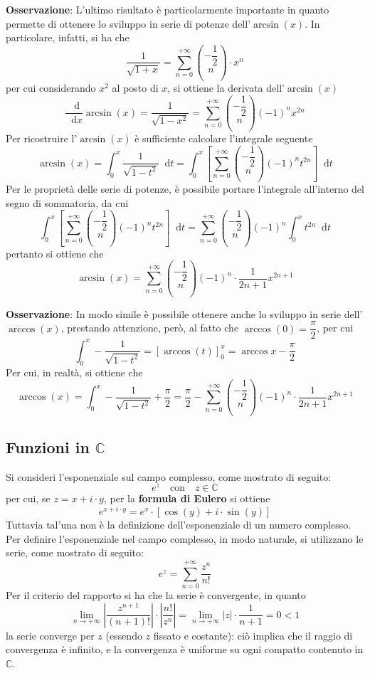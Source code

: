 \documentclass[a4paper]{extarticle}
\newcommand*\dif{\mathop{}\!\mathrm{d}}
\begin{document}
\vspace{1em}
\noindent
\textbf{Osservazione}: L'ultimo risultato è particolarmente importante in quanto permette di ottenere lo sviluppo in serie di potenze dell'$\arcsin(x)$. In particolare, infatti, si ha che
\[\frac{1}{\sqrt{1+x}} = \sum_{n=0}^{+\infty} \binom{-\dfrac{1}{2}}{n} \cdot x^n\]
per cui considerando $x^2$ al posto di $x$, si ottiene la derivata dell'$\arcsin(x)$
\[\dfrac{\dif}{\dif x} \arcsin(x) = \frac{1}{\sqrt{1-x^2}} = \sum_{n=0}^{+\infty} \binom{-\dfrac{1}{2}}{n} (-1)^n x^{2n}\]
Per ricostruire l'$\arcsin(x)$ è sufficiente calcolare l'integrale seguente
\[\arcsin(x)=\int_0^x \frac{1}{\sqrt{1-t^2}} \dif t = \int_0^x \left[ \sum_{n=0}^{+\infty} \binom{-\dfrac{1}{2}}{n} (-1)^n t^{2n}\right] \dif t\]
Per le proprietà delle serie di potenze, è possibile portare l'integrale all'interno del segno di sommatoria, da cui
\[\int_0^x \left[ \sum_{n=0}^{+\infty} \binom{-\dfrac{1}{2}}{n} (-1)^n t^{2n}\right] \dif t = \sum_{n=0}^{+\infty} \binom{-\dfrac{1}{2}}{n} (-1)^n \int_0^x t^{2n} \dif t\]
pertanto si ottiene che
\[\arcsin(x)=\sum_{n=0}^{+\infty} \binom{-\dfrac{1}{2}}{n} (-1)^n \cdot \frac{1}{2n+1} x^{2n+1}\]

\vspace{1em}
\noindent
\textbf{Osservazione}: In modo simile è possibile ottenere anche lo sviluppo in serie dell'$\arccos(x)$, prestando attenzione, però, al fatto che $\arccos(0)=\dfrac{\pi}{2}$, per cui
\[\int_0^x - \dfrac{1}{\sqrt{1-t^2}} = [\arccos(t)]_0^x = \arccos{x}-\dfrac{\pi}{2}\]
Per cui, in realtà, si ottiene che
\[\arccos(x) = \int_0^x - \dfrac{1}{\sqrt{1-t^2}} + \dfrac{\pi}{2} = \dfrac{\pi}{2}-\sum_{n=0}^{+\infty} \binom{-\dfrac{1}{2}}{n} (-1)^n \cdot \frac{1}{2n+1} x^{2n+1}\]

\vspace{1em}
\noindent
\subsection{Funzioni in $\mathbb{C}$}
Si consideri l'esponenziale sul campo complesso, come mostrato di seguito:
\[e^z \hspace{1em} \text{con} \hspace{1em} z \in \mathbb{C}\]
per cui, se $z=x+i \cdot y$, per la \textbf{formula di Eulero} si ottiene
\[e^{x+i\cdot y} = e^x \cdot \left[\cos(y) + i \cdot \sin(y)\right]\]
Tuttavia tal'una non è la definizione dell'esponenziale di un numero complesso. Per definire l'esponenziale nel campo complesso, in modo naturale, si utilizzano le serie, come mostrato di seguito:
\[e^z = \sum_{n=0}^{+\infty} \frac{z^n}{n!}\]
Per il criterio del rapporto si ha che la serie è convergente, in quanto
\[\lim_{n \to +\infty} \left \vert \frac{z^{n+1}}{(n+1)!} \right \vert \cdot \left \vert \frac{n!}{z^n} \right \vert = \lim_{n \to +\infty} \vert z \vert \cdot \frac{1}{n+1} = 0 < 1\]
la serie converge per $z$ (essendo $z$ fissato e costante): ciò implica che il raggio di convergenza è infinito, e la convergenza è uniforme su ogni compatto contenuto in $\mathbb{C}$.
\end{document}
